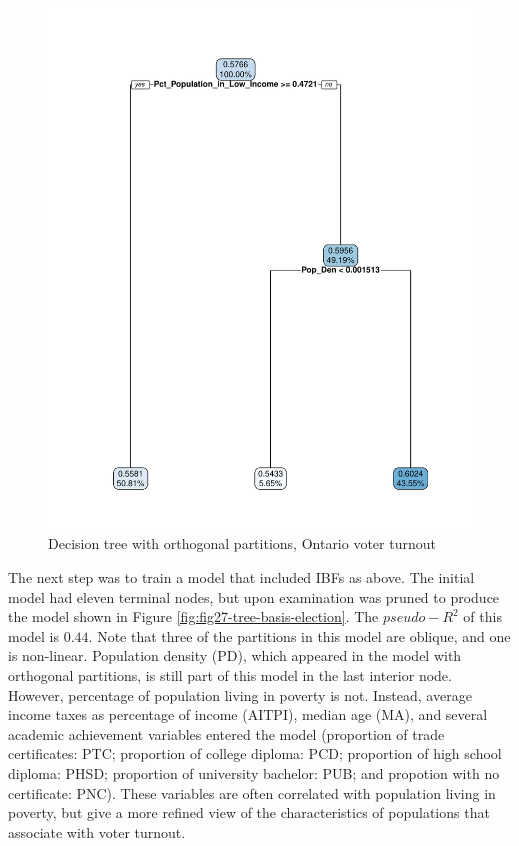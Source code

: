 \documentclass[]{elsarticle} %
\makeatletter
\def\maxwidth{\ifdim\Gin@nat@width>\linewidth\linewidth
\else\Gin@nat@width\fi}
\let\Oldincludegraphics\includegraphics
\renewcommand{\includegraphics}[1]{\Oldincludegraphics[width=\maxwidth]{#1}}
\makeatother
\begin{document}
\begin{figure}[htbp]
\centering
\includegraphics{Trees_with_Base_Functions_v2_files/figure-latex/fig26-tree-orthogonal-election-1.pdf}
\caption{\label{fig:fig26-tree-orthogonal-election}Decision tree with
orthogonal partitions, Ontario voter turnout}
\end{figure}

The next step was to train a model that included IBFs as above. The
initial model had eleven terminal nodes, but upon examination was pruned
to produce the model shown in Figure
\ref{fig:fig27-tree-basis-election}. The \(pseudo-R^2\) of this model is
\(0.44\). Note that three of the partitions in this model are oblique,
and one is non-linear. Population density (PD), which appeared in the
model with orthogonal partitions, is still part of this model in the
last interior node. However, percentage of population living in poverty
is not. Instead, average income taxes as percentage of income (AITPI),
median age (MA), and several academic achievement variables entered the
model (proportion of trade certificates: PTC; proportion of college
diploma: PCD; proportion of high school diploma: PHSD; proportion of
university bachelor: PUB; and propotion with no certificate: PNC). These
variables are often correlated with population living in poverty, but
give a more refined view of the characteristics of populations that
associate with voter turnout.
\end{document}
